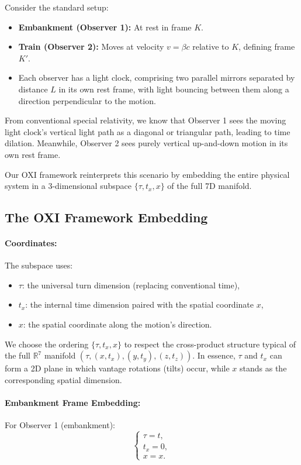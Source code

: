 \documentclass{article}
\begin{document}
Consider the standard setup:
\begin{itemize}
  \item \textbf{Embankment (Observer 1):} At rest in frame \(K\).
  \item \textbf{Train (Observer 2):} Moves at velocity \(v = \beta c\) relative to \(K\), defining frame \(K'\).
  \item Each observer has a light clock, comprising two parallel mirrors separated by distance \(L\) in its own rest frame, with light bouncing between them along a direction perpendicular to the motion.
\end{itemize}

From conventional special relativity, we know that Observer 1 sees the moving light clock's vertical light path as a diagonal or triangular path, leading to time dilation. Meanwhile, Observer 2 sees purely vertical up-and-down motion in its own rest frame.

Our OXI framework reinterprets this scenario by embedding the entire physical system in a 3-dimensional subspace \(\{\tau, t_x, x\}\) of the full 7D manifold.

\subsection{The OXI Framework Embedding}

\paragraph{Coordinates:} The subspace uses:
\begin{itemize}
  \item \(\tau\): the universal turn dimension (replacing conventional time),
  \item \(t_x\): the internal time dimension paired with the spatial coordinate \(x\),
  \item \(x\): the spatial coordinate along the motion's direction.
\end{itemize}

We choose the ordering \(\{\tau, t_x, x\}\) to respect the cross-product structure typical of the full \(\mathbb{R}^7\) manifold \( (\tau, (x, t_x), (y, t_y), (z, t_z)) \). In essence, \(\tau\) and \(t_x\) can form a 2D plane in which vantage rotations (tilts) occur, while \(x\) stands as the corresponding spatial dimension.

\paragraph{Embankment Frame Embedding:} For Observer 1 (embankment):
\begin{equation}
\begin{cases}
\tau = t,\\
t_x = 0,\\
x = x.
\end{cases}
\end{equation}
\end{document}
